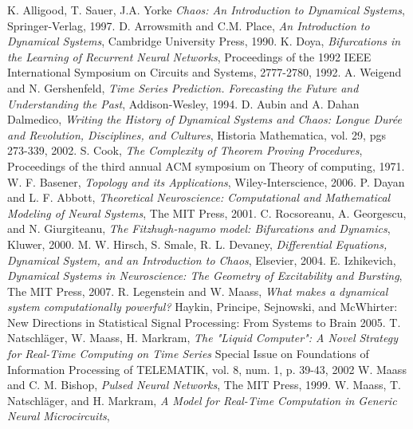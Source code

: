 \documentclass{elsart1p}
\begin{document}



\begin{thebibliography}{widest-label}
 K. Alligood, T. Sauer, J.A. Yorke
 \emph{Chaos:  An Introduction to Dynamical Systems},
 Springer-Verlag, 
 1997.
 D. Arrowsmith and C.M. Place,
 \emph{An Introduction to Dynamical Systems},
 Cambridge University Press,
 1990.
 K. Doya,
 \emph{Bifurcations in the Learning of Recurrent Neural Networks},
 Proceedings of the 1992 IEEE International Symposium on Circuits and Systems,
 2777-2780,
 1992.
 A. Weigend and N. Gershenfeld,
 \emph{Time Series Prediction.  Forecasting the Future and Understanding the Past},
 Addison-Wesley,
 1994.
 D. Aubin and A. Dahan Dalmedico,
 \emph{Writing the History of Dynamical Systems and Chaos:  Longue Dur\'ee and Revolution, Disciplines, and Cultures},
 Historia Mathematica,
 vol. 29,
 pgs 273-339,
 2002.
 S. Cook,
 \emph{The Complexity of Theorem Proving Procedures},
 Proceedings of the third annual ACM symposium on Theory of computing,
 1971.
 W. F. Basener,
 \emph{Topology and its Applications},
 Wiley-Interscience,
 2006.
 P. Dayan and L. F. Abbott,
 \emph{Theoretical Neuroscience:  Computational and Mathematical Modeling of Neural Systems},
 The MIT Press,
 2001.
 C. Rocsoreanu, A. Georgescu, and N. Giurgiteanu,
 \emph{The Fitzhugh-nagumo model:  Bifurcations and Dynamics},
 Kluwer,
 2000.
 M. W. Hirsch, S. Smale, R. L. Devaney,
 \emph{Differential Equations, Dynamical System, and an Introduction to Chaos},
 Elsevier,
 2004.
 E. Izhikevich,
 \emph{Dynamical Systems in Neuroscience:  The Geometry of Excitability and Bursting},
 The MIT Press,
 2007.
 R. Legenstein and W. Maass,
 \emph{What makes a dynamical system computationally powerful?}
 Haykin, Principe, Sejnowski, and McWhirter:
 New Directions in Statistical Signal Processing:  From Systems to Brain
 2005.
 T. Natschl\"ager, W. Maass, H. Markram,
 \emph{The "Liquid Computer":  A Novel Strategy for Real-Time Computing on Time Series}
  Special Issue on Foundations of Information Processing of TELEMATIK, 
  vol. 8, 
  num. 1, 
  p. 39-43,
  2002 
 W. Maass and C. M. Bishop,
 \emph{Pulsed Neural Networks},
 The MIT Press,
 1999.
 W. Maass, T. Natschl\"ager, and H. Markram,
 \emph{A Model for Real-Time Computation in Generic Neural Microcircuits},

\end{thebibliography}
\end{document}
